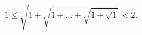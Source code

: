 \begin{equation*}
	1 \le \sqrt{1 + \sqrt{ 1 + \hdots + \sqrt{ 1 + \sqrt{ 1 } } }} < 2.
\end{equation*}
